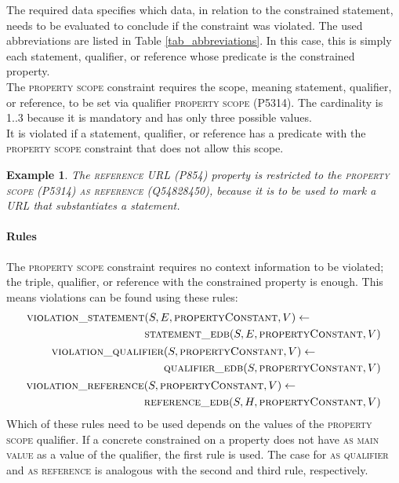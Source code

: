 \documentclass[hyperref,bachelorofscience,fleqn]{cgvpub}
\newtheorem{example}{Example}
\begin{document}
The required data specifies which data, in relation to the constrained statement, needs to be evaluated to conclude if the constraint was violated. The used abbreviations are listed in Table \ref{tab_abbreviations}. In this case, this is simply each statement, qualifier, or reference whose predicate is the constrained property.\\
The \textsc{property scope} constraint requires the scope, meaning statement, qualifier, or reference, to be set via qualifier \textsc{property scope} (P5314). The cardinality is 1..3 because it is mandatory and has only three possible values.\\
It is violated if a statement, qualifier, or reference has a predicate with the \textsc{property scope} constraint that does not allow this scope.\\

\begin{example}
The \textsc{reference URL} (P854) property is restricted to the \textsc{property scope} (P5314) \textsc{as reference} (Q54828450), because it is to be used to mark a URL that substantiates a statement.
\end{example}

\paragraph{Rules}
The \textsc{property scope} constraint requires no context information to be violated; the triple, qualifier, or reference with the constrained property is enough. This means violations can be found using these rules:
\begin{align}
\begin{split}
\textsc{violation\_statement}&(S, E, \textsc{propertyConstant}, V) \leftarrow \\
&\textsc{statement\_edb}(S, E, \textsc{propertyConstant}, V)\\
\end{split}\\
\begin{split}
\textsc{violation\_qualifier}&(S, \textsc{propertyConstant}, V) \leftarrow \\
&\textsc{qualifier\_edb}(S, \textsc{propertyConstant}, V)\\
\end{split}\\
\begin{split}
\textsc{violation\_reference}&(S, \textsc{propertyConstant}, V) \leftarrow \\
&\textsc{reference\_edb}(S, H, \textsc{propertyConstant}, V)\\
\end{split}
\end{align}
Which of these rules need to be used depends on the values of the \textsc{property scope} qualifier. If a concrete constrained on a property does not have \textsc{as main value} as a value of the qualifier, the first rule is used. The case for \textsc{as qualifier} and \textsc{as reference} is analogous with the second and third rule, respectively.
\end{document}
